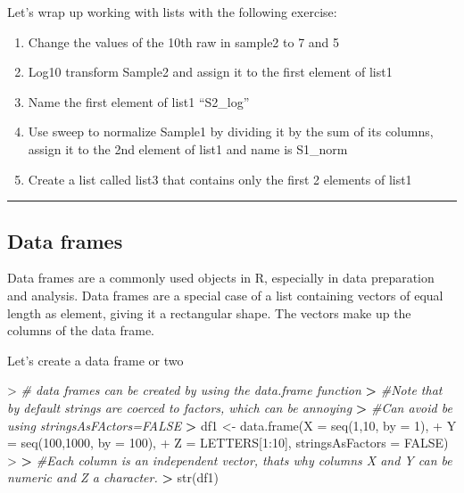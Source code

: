 \documentclass[
]{book}
\newenvironment{Shaded}{\begin{snugshade}}{\end{snugshade}}
\newcommand{\AttributeTok}[1]{\textcolor[rgb]{0.77,0.63,0.00}{#1}}
\newcommand{\CommentTok}[1]{\textcolor[rgb]{0.56,0.35,0.01}{\textit{#1}}}
\newcommand{\ConstantTok}[1]{\textcolor[rgb]{0.00,0.00,0.00}{#1}}
\newcommand{\DecValTok}[1]{\textcolor[rgb]{0.00,0.00,0.81}{#1}}
\newcommand{\ErrorTok}[1]{\textcolor[rgb]{0.64,0.00,0.00}{\textbf{#1}}}
\newcommand{\FunctionTok}[1]{\textcolor[rgb]{0.00,0.00,0.00}{#1}}
\newcommand{\NormalTok}[1]{#1}
\newcommand{\OtherTok}[1]{\textcolor[rgb]{0.56,0.35,0.01}{#1}}
\newcommand{\SpecialCharTok}[1]{\textcolor[rgb]{0.00,0.00,0.00}{#1}}
\providecommand{\tightlist}{%
  \setlength{\itemsep}{0pt}\setlength{\parskip}{0pt}}
\theoremstyle{definition}
\theoremstyle{definition}
\theoremstyle{definition}
\theoremstyle{definition}
\theoremstyle{remark}
\begin{document}
Let's wrap up working with lists with the following exercise:

\begin{enumerate}
\def\labelenumi{\arabic{enumi}.}
\tightlist
\item
  Change the values of the 10th raw in sample2 to 7 and 5
\item
  Log10 transform Sample2 and assign it to the first element of list1
\item
  Name the first element of list1 ``S2\_log''
\item
  Use sweep to normalize Sample1 by dividing it by the sum of its columns, assign it to the 2nd element of list1 and name is S1\_norm
\item
  Create a list called list3 that contains only the first 2 elements of list1
\end{enumerate}

\begin{center}\rule{0.5\linewidth}{0.5pt}\end{center}

\hypertarget{data-frames}{%
\subsection*{\texorpdfstring{\textbf{Data frames}}{Data frames}}\label{data-frames}}

Data frames are a commonly used objects in R, especially in data preparation and analysis.
Data frames are a special case of a list containing vectors of equal length as element, giving it a rectangular shape. The
vectors make up the columns of the data frame.

Let's create a data frame or two

\begin{Shaded}
\begin{Highlighting}[]
\SpecialCharTok{\textgreater{}} \CommentTok{\# data frames can be created by using the data.frame function}
\ErrorTok{\textgreater{}} \CommentTok{\#Note that by default strings are coerced to factors, which can be annoying}
\ErrorTok{\textgreater{}} \CommentTok{\#Can avoid be using stringsAsFActors=FALSE}
\ErrorTok{\textgreater{}}\NormalTok{ df1 }\OtherTok{\textless{}{-}} \FunctionTok{data.frame}\NormalTok{(}\AttributeTok{X =} \FunctionTok{seq}\NormalTok{(}\DecValTok{1}\NormalTok{,}\DecValTok{10}\NormalTok{, }\AttributeTok{by =} \DecValTok{1}\NormalTok{), }
\SpecialCharTok{+}                   \AttributeTok{Y =} \FunctionTok{seq}\NormalTok{(}\DecValTok{100}\NormalTok{,}\DecValTok{1000}\NormalTok{, }\AttributeTok{by =} \DecValTok{100}\NormalTok{),}
\SpecialCharTok{+}                   \AttributeTok{Z =}\NormalTok{ LETTERS[}\DecValTok{1}\SpecialCharTok{:}\DecValTok{10}\NormalTok{], }\AttributeTok{stringsAsFactors =} \ConstantTok{FALSE}\NormalTok{)}
\SpecialCharTok{\textgreater{}} 
\ErrorTok{\textgreater{}} \CommentTok{\#Each column is an independent vector, that\textquotesingle{}s why columns X and Y can be numeric and Z a character.}
\ErrorTok{\textgreater{}} \FunctionTok{str}\NormalTok{(df1)}
\end{Highlighting}
\end{Shaded}
\end{document}
